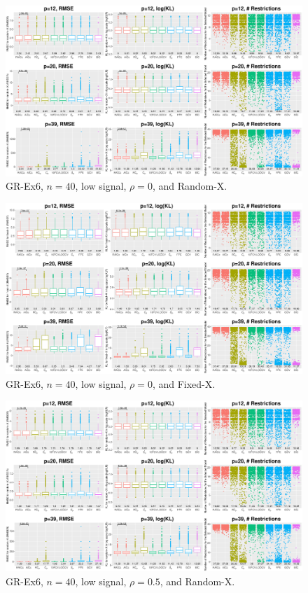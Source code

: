 \clearpage
\begin{figure}[!ht]
\centering
\includegraphics[width=\textwidth]{figures/supplement/randomx_GR-Ex6_n40_lsnr_rho0.eps}
\caption{GR-Ex6, $n=40$, low signal, $\rho=0$, and Random-X.}
\end{figure}
\begin{figure}[!ht]
\centering
\includegraphics[width=\textwidth]{figures/supplement/fixedx_GR-Ex6_n40_lsnr_rho0.eps}
\caption{GR-Ex6, $n=40$, low signal, $\rho=0$, and Fixed-X.}
\end{figure}
\clearpage
\begin{figure}[!ht]
\centering
\includegraphics[width=\textwidth]{figures/supplement/randomx_GR-Ex6_n40_lsnr_rho05.eps}
\caption{GR-Ex6, $n=40$, low signal, $\rho=0.5$, and Random-X.}
\end{figure}
